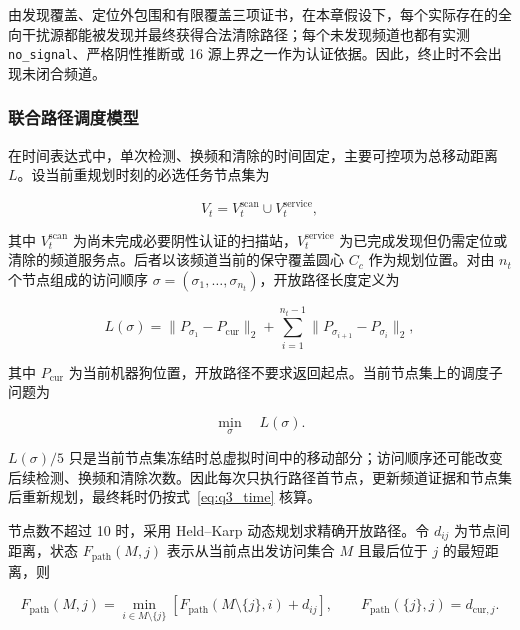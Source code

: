 由发现覆盖、定位外包围和有限覆盖三项证书，在本章假设下，每个实际存在的全向干扰源都能被发现并最终获得合法清除路径；每个未发现频道也都有实测 \texttt{no\_signal}、严格阴性推断或 16 源上界之一作为认证依据。因此，终止时不会出现未闭合频道。

\subsubsection{联合路径调度模型}

在时间表达式中，单次检测、换频和清除的时间固定，主要可控项为总移动距离 $L$。设当前重规划时刻的必选任务节点集为

\begin{equation}
V_t=V_t^{\mathrm{scan}}\cup V_t^{\mathrm{service}},
\label{eq:q3_task_nodes}
\end{equation}

其中 $V_t^{\mathrm{scan}}$ 为尚未完成必要阴性认证的扫描站，$V_t^{\mathrm{service}}$ 为已完成发现但仍需定位或清除的频道服务点。后者以该频道当前的保守覆盖圆心 $C_c$ 作为规划位置。对由 $n_t$ 个节点组成的访问顺序 $\sigma=(\sigma_1,\ldots,\sigma_{n_t})$，开放路径长度定义为

\begin{equation}
L(\sigma)
=
\lVert P_{\sigma_1}-P_{\mathrm{cur}}\rVert_2
+
\sum_{i=1}^{n_t-1}
\lVert P_{\sigma_{i+1}}-P_{\sigma_i}\rVert_2,
\label{eq:q3_open_path}
\end{equation}

其中 $P_{\mathrm{cur}}$ 为当前机器狗位置，开放路径不要求返回起点。当前节点集上的调度子问题为

\begin{equation}
\min_{\sigma}\quad L(\sigma).
\label{eq:q3_route_problem}
\end{equation}

$L(\sigma)/5$ 只是当前节点集冻结时总虚拟时间中的移动部分；访问顺序还可能改变后续检测、换频和清除次数。因此每次只执行路径首节点，更新频道证据和节点集后重新规划，最终耗时仍按式~\eqref{eq:q3_time} 核算。

节点数不超过 10 时，采用 Held--Karp 动态规划求精确开放路径。令 $d_{ij}$ 为节点间距离，状态 $F_{\mathrm{path}}(M,j)$ 表示从当前点出发访问集合 $M$ 且最后位于 $j$ 的最短距离，则

\begin{equation}
F_{\mathrm{path}}(M,j)
=
\min_{i\in M\setminus\{j\}}
\left[
F_{\mathrm{path}}(M\setminus\{j\},i)+d_{ij}
\right],
\qquad
F_{\mathrm{path}}(\{j\},j)=d_{\mathrm{cur},j}.
\label{eq:q3_held_karp}
\end{equation}

